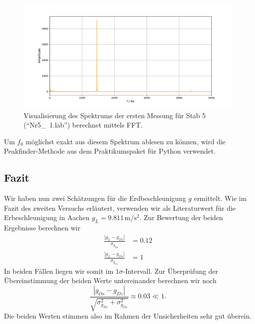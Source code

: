\documentclass[a4paper, 12pt]{scrartcl}
\begin{document}
\begin{figure}[h]
	\centering
	\includegraphics[width=\linewidth]{plots/spektrum1.pdf}
	\caption{Visualisierung des Spektrums der ersten Messung für Stab 5 (\mbox{``Nr5\_ 1.lab''}) berechnet mittels FFT.}
	\label{pic:spektrum1}
\end{figure}

Um $f_0$ möglichst exakt aus diesem Spektrum ablesen zu können, wird die Peakfinder-Methode aus dem Praktikumspaket für Python verwendet.

\subsection{Fazit}

Wir haben nun zwei Schätzungen für die Erdbeschleunigung $g$ ermittelt. Wie im Fazit des zweiten Versuchs erläutert, verwenden wir als Literaturwert für die Erbeschleunigung in Aachen $g_L = 9.811 \, \mathrm m / \mathrm s^2$. 
Zur Bewertung der beiden Ergebnisse berechnen wir
\begin{align*}
\frac{|g_L-g_{Dz}|}{\sigma_{g_{Dz}}} &= 0.12 \\
\frac{|g_L-g_{Os}|}{\sigma_{g_{Os}}} &= 1
\end{align*}
In beiden Fällen liegen wir somit im $1\sigma$-Intervall. Zur Überprüfung der Übereinstimmung der beiden Werte untereinander berechnen wir noch
$$\frac{|g_{Os}-g_{Dz}|}{\sqrt{\sigma_{g_{Dz}}^2 + \sigma_{g_{Os}}^2}} \approx 0.03 \ll 1.$$
Die beiden Werten stimmen also im Rahmen der Unsicherheiten sehr gut überein. 


\newpage
\end{document}
